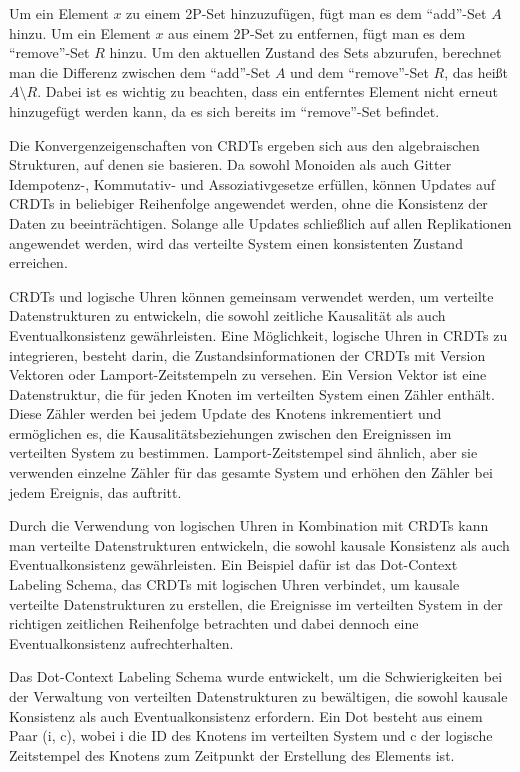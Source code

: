 Um ein Element $x$ zu einem 2P-Set hinzuzufügen, fügt man es dem \enquote{add}-Set $A$ hinzu. Um ein Element $x$ aus einem 2P-Set zu entfernen, fügt man es dem \enquote{remove}-Set $R$ hinzu. Um den aktuellen Zustand des Sets abzurufen, berechnet man die Differenz zwischen dem \enquote{add}-Set $A$ und dem \enquote{remove}-Set $R$, das heißt $A \setminus R$. Dabei ist es wichtig zu beachten, dass ein entferntes Element nicht erneut hinzugefügt werden kann, da es sich bereits im \enquote{remove}-Set befindet.

Die Konvergenzeigenschaften von CRDTs ergeben sich aus den algebraischen Strukturen, auf denen sie basieren. Da sowohl Monoiden als auch Gitter Idempotenz-, Kommutativ- und Assoziativgesetze erfüllen, können Updates auf CRDTs in beliebiger Reihenfolge angewendet werden, ohne die Konsistenz der Daten zu beeinträchtigen. Solange alle Updates schließlich auf allen Replikationen angewendet werden, wird das verteilte System einen konsistenten Zustand erreichen.

CRDTs und logische Uhren können gemeinsam verwendet werden, um verteilte Datenstrukturen zu entwickeln, die sowohl zeitliche Kausalität als auch Eventualkonsistenz gewährleisten. Eine Möglichkeit, logische Uhren in CRDTs zu integrieren, besteht darin, die Zustandsinformationen der CRDTs mit Version Vektoren oder Lamport-Zeitstempeln zu versehen.
Ein Version Vektor ist eine Datenstruktur, die für jeden Knoten im verteilten System einen Zähler enthält. Diese Zähler werden bei jedem Update des Knotens inkrementiert und ermöglichen es, die Kausalitätsbeziehungen zwischen den Ereignissen im verteilten System zu bestimmen. Lamport-Zeitstempel sind ähnlich, aber sie verwenden einzelne Zähler für das gesamte System und erhöhen den Zähler bei jedem Ereignis, das auftritt.

Durch die Verwendung von logischen Uhren in Kombination mit CRDTs kann man verteilte Datenstrukturen entwickeln, die sowohl kausale Konsistenz als auch Eventualkonsistenz gewährleisten. Ein Beispiel dafür ist das Dot-Context Labeling Schema, das CRDTs mit logischen Uhren verbindet, um kausale verteilte Datenstrukturen zu erstellen, die Ereignisse im verteilten System in der richtigen zeitlichen Reihenfolge betrachten und dabei dennoch eine Eventualkonsistenz aufrechterhalten.

Das Dot-Context Labeling Schema wurde entwickelt, um die Schwierigkeiten bei der Verwaltung von verteilten Datenstrukturen zu bewältigen, die sowohl kausale Konsistenz als auch Eventualkonsistenz erfordern. Ein Dot besteht aus einem Paar (i, c), wobei i die ID des Knotens im verteilten System und c der logische Zeitstempel des Knotens zum Zeitpunkt der Erstellung des Elements ist.

